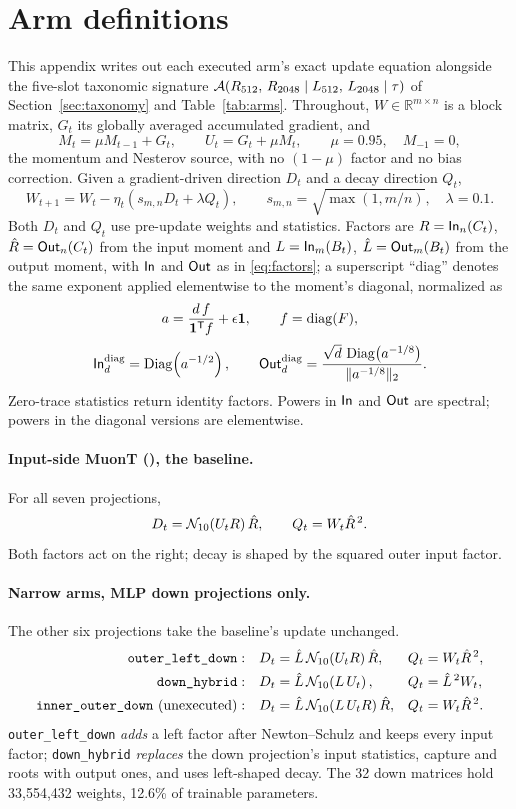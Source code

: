 \section{Arm definitions}
\label{app:arms}

This appendix writes out each executed arm's exact update equation alongside the
five-slot taxonomic signature $\mathcal{A}\!\left(R_{512},\,R_{2048}\;\middle|\;L_{512},\,L_{2048}\;\middle|\;\tau\right)$
of Section~\ref{sec:taxonomy} and Table~\ref{tab:arms}. Throughout, $W\in\mathbb
R^{m\times n}$ is a block matrix, $G_t$ its globally averaged accumulated
gradient, and
\[
M_t=\mu M_{t-1}+G_t,\qquad U_t=G_t+\mu M_t,\qquad \mu=0.95,\quad M_{-1}=0,
\]
the momentum and Nesterov source, with no $(1-\mu)$ factor and no bias
correction. Given a gradient-driven direction $D_t$ and a decay direction
$Q_t$,
\begin{equation}
\label{eq:update}
W_{t+1}=W_t-\eta_t\left(s_{m,n}D_t+\lambda Q_t\right),
\qquad s_{m,n}=\sqrt{\max(1,m/n)},\quad \lambda=0.1 .
\end{equation}
Both $D_t$ and $Q_t$ use pre-update weights and statistics. Factors are
$R=\mathsf{In}_n(C_t)$, $\hat R=\mathsf{Out}_n(C_t)$ from the input moment and
$L=\mathsf{In}_m(B_t)$, $\hat L=\mathsf{Out}_m(B_t)$ from the output moment, with $\mathsf{In}$ and
$\mathsf{Out}$ as in \eqref{eq:factors}; a superscript ``diag'' denotes the same
exponent applied elementwise to the moment's diagonal, normalized as
\[
a=\frac{d\,f}{\mathbf 1^{{\mathsf T}}f}+\epsilon\mathbf 1,
\qquad f=\operatorname{diag}(F),
\]
\[
\mathsf{In}^{\text{diag}}_d=\operatorname{Diag}\!\left(a^{-1/2}\right),\qquad
\mathsf{Out}^{\text{diag}}_d=\frac{\sqrt d\,\operatorname{Diag}\!\left(a^{-1/8}\right)}{\|a^{-1/8}\|_2}.
\]
Zero-trace statistics return identity factors. Powers in $\mathsf{In}$ and $\mathsf{Out}$ are
spectral; powers in the diagonal versions are elementwise.

\paragraph{Input-side MuonT (\muont{}), the baseline.}
For all seven projections,
\[
D_t=\mathcal{N}_{10}\!\left(U_tR\right)\hat R,\qquad Q_t=W_t\hat R^{\,2}.
\]
Both factors act on the right; decay is shaped by the squared outer input
factor.

\paragraph{Narrow arms, MLP down projections only.}
The other six projections take the baseline's update unchanged.
\begin{align*}
\texttt{outer\_left\_down}:\quad & D_t=\hat L\,\mathcal{N}_{10}\!\left(U_tR\right)\hat R, & Q_t&=W_t\hat R^{\,2},\\
\texttt{down\_hybrid}:\quad & D_t=\hat L\,\mathcal{N}_{10}\!\left(L\,U_t\right), & Q_t&=\hat L^{\,2}W_t,\\
\texttt{inner\_outer\_down}\ (\text{unexecuted}):\quad & D_t=\hat L\,\mathcal{N}_{10}\!\left(L\,U_tR\right)\hat R, & Q_t&=W_t\hat R^{\,2}.
\end{align*}
\texttt{outer\_left\_down} \emph{adds} a left factor after Newton--Schulz and
keeps every input factor; \texttt{down\_hybrid} \emph{replaces} the down
projection's input statistics, capture and roots with output ones, and uses
left-shaped decay. The 32 down matrices hold 33{,}554{,}432 weights, 12.6\% of
trainable parameters.

